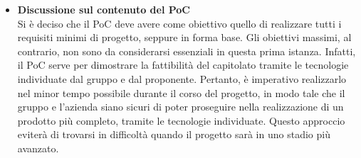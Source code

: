 \begin{itemize}
\begin{itemize}
        \end{itemize}
        \item \textbf{Discussione sul contenuto del PoC} \\
        Si è deciso che il PoC deve avere come obiettivo quello di realizzare tutti i requisiti minimi di progetto, seppure in forma base. Gli obiettivi massimi, al contrario, non sono da considerarsi essenziali in questa prima istanza. Infatti, il PoC serve per dimostrare la fattibilità del capitolato tramite le tecnologie individuate dal gruppo e dal proponente. Pertanto, è imperativo realizzarlo nel minor tempo possibile durante il corso del progetto, in modo tale che il gruppo e l'azienda siano sicuri di poter proseguire nella realizzazione di un prodotto più completo, tramite le tecnologie individuate. Questo approccio eviterà di trovarsi in difficoltà quando il progetto sarà in uno stadio più avanzato.
    \end{itemize}
